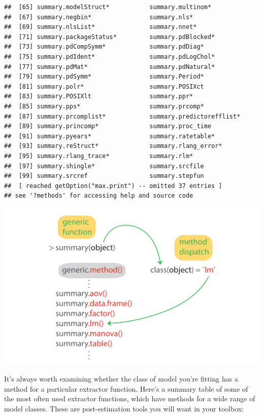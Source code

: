 \documentclass[
]{book}
\begin{document}
\begin{verbatim}
##  [65] summary.modelStruct*           summary.multinom*             
##  [67] summary.negbin*                summary.nls*                  
##  [69] summary.nlsList*               summary.nnet*                 
##  [71] summary.packageStatus*         summary.pdBlocked*            
##  [73] summary.pdCompSymm*            summary.pdDiag*               
##  [75] summary.pdIdent*               summary.pdLogChol*            
##  [77] summary.pdMat*                 summary.pdNatural*            
##  [79] summary.pdSymm*                summary.Period*               
##  [81] summary.polr*                  summary.POSIXct               
##  [83] summary.POSIXlt                summary.ppr*                  
##  [85] summary.pps*                   summary.prcomp*               
##  [87] summary.prcomplist*            summary.predictorefflist*     
##  [89] summary.princomp*              summary.proc_time             
##  [91] summary.pyears*                summary.ratetable*            
##  [93] summary.reStruct*              summary.rlang_error*          
##  [95] summary.rlang_trace*           summary.rlm*                  
##  [97] summary.shingle*               summary.srcfile               
##  [99] summary.srcref                 summary.stepfun               
##  [ reached getOption("max.print") -- omitted 37 entries ]
## see '?methods' for accessing help and source code
\end{verbatim}

\includegraphics{R/Rmodels/images/methods.png}

It's always worth examining whether the class of model you're fitting has a method for a particular extractor function.
Here's a summary table of some of the most often used extractor functions, which have methods for a wide range of model classes. These are post-estimation tools you will want in your toolbox:
\end{document}
